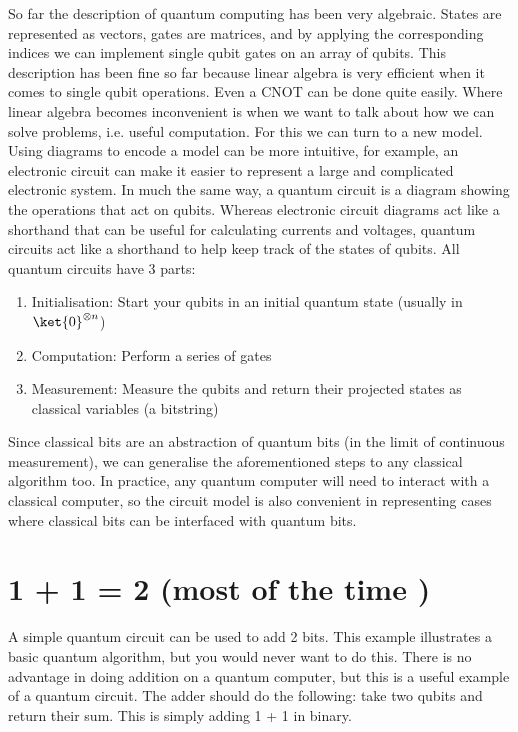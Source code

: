 \documentclass{book}
\begin{document}
So far the description of quantum computing has been very algebraic. States are represented as vectors, gates are matrices, and by applying the corresponding indices we can implement single qubit gates on an array of qubits. This description has been fine so far because linear algebra is very efficient when it comes to single qubit operations. Even a CNOT can be done quite easily. Where linear algebra becomes inconvenient is when we want to talk about how we can solve problems, i.e. useful computation. For this we can turn to a new model. Using diagrams to encode a model can be more intuitive, for example, an electronic circuit can make it easier to represent a large and complicated electronic system. In much the same way, a quantum circuit is a diagram showing the operations that act on qubits. Whereas electronic circuit diagrams act like a shorthand that can be useful for calculating currents and voltages, quantum circuits act like a shorthand to help keep track of the states of qubits. All quantum circuits have 3 parts:

\begin{enumerate}
    \item Initialisation: Start your qubits in an initial quantum state (usually in $\ket{0}^{\otimes n}$)
    \item Computation: Perform a series of gates 
    \item Measurement: Measure the qubits and return their projected states as classical variables (a bitstring)
\end{enumerate}

Since classical bits are an abstraction of quantum bits (in the limit of continuous measurement), we can generalise the aforementioned steps to any classical algorithm too. In practice, any quantum computer will need to interact with a classical computer, so the circuit model is also convenient in representing cases where classical bits can be interfaced with quantum bits.


\section{  1 + 1 = 2 (most of the time )}

A simple quantum circuit can be used to add 2 bits. This example illustrates a basic quantum algorithm, but you would never want to do this. There is no advantage in doing addition on a quantum computer, but this is a useful example of a quantum circuit. The adder should do the following: take two qubits and return their sum. This is simply adding 1 + 1 in binary.
\end{document}

